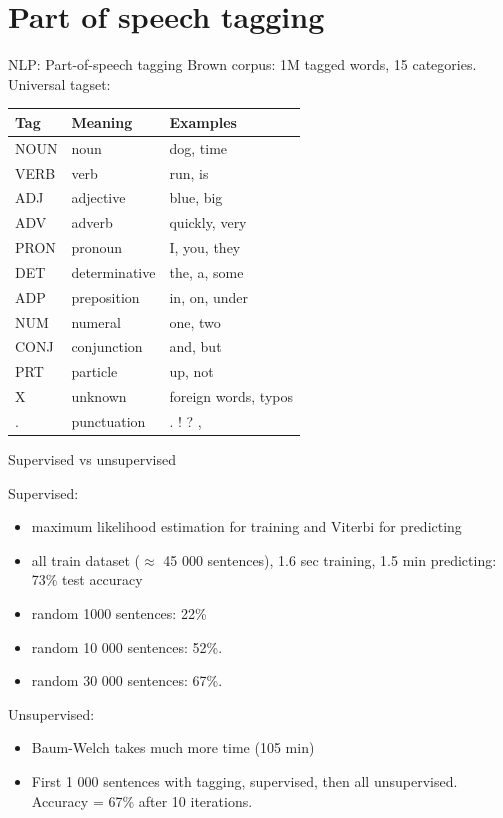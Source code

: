 \documentclass{beamer}
\begin{document}
\section{Part of speech tagging}
\begin{frame}{NLP: Part-of-speech tagging}
    Brown corpus: 1M tagged words, 15 categories.
    Universal tagset:
    \begin{table}[h]
        \centering
        \begin{tabular}{lll}
            \toprule
            \textbf{Tag} & \textbf{Meaning} & \textbf{Examples} \\
            \midrule
            NOUN & noun & dog, time \\
            VERB & verb & run, is \\
            ADJ & adjective & blue, big \\
            ADV & adverb & quickly, very \\
            PRON & pronoun & I, you, they \\
            DET & determinative & the, a, some \\
            ADP & preposition & in, on, under \\
            NUM & numeral & one, two \\
            CONJ & conjunction & and, but \\
            PRT & particle & up, not \\
            X & unknown & foreign words, typos \\
            . & punctuation & . ! ? , \\
            \bottomrule
        \end{tabular}
    \end{table}
\end{frame}
\begin{frame}{Supervised vs unsupervised}

Supervised: 
\begin{itemize}
    \item maximum likelihood estimation for training and Viterbi for predicting 
    \item all train dataset ($\approx$ 45 000 sentences), 1.6 sec training, 1.5 min predicting: 73\% test accuracy
    \item random 1000 sentences: 22\%
    \item random 10 000 sentences: 52\%.
    \item random 30 000 sentences: 67\%.
\end{itemize}
Unsupervised:
\begin{itemize}
    \item Baum-Welch takes much more time (105 min)
    \item First 1 000 sentences with tagging, supervised, then all unsupervised. Accuracy = 67\% after 10 iterations.
\end{itemize}
\end{frame}
\end{document}
